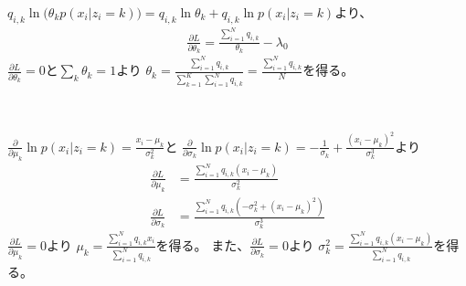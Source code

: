 \documentclass[aspectratio=169,unicode,dvipdfmx,14pt]{beamer}
\begin{document}
\begin{frame}
\FontMath
$q_{i,k} \ln \big( \theta_k p(x_i | z_i = k) \big)
= q_{i,k} \ln \theta_k + q_{i,k} \ln p(x_i | z_i = k)$より、
\begin{align}
\frac{\partial L}{\partial \theta_k}
= \frac{ \sum_{i=1}^N  q_{i,k} }{ \theta_k } - \lambda_0
\end{align}
$\frac{\partial L}{\partial \theta_k} = 0$と$\sum_k \theta_k = 1$より
$\theta_k = \frac{ \sum_{i=1}^N q_{i,k} }{ \sum_{k=1}^K \sum_{i=1}^N q_{i,k} } = \frac{ \sum_{i=1}^N q_{i,k} }{ N }$を得る。

\

$\frac{\partial }{\partial \mu_k} \ln p(x_i | z_i = k) = \frac{ x_i - \mu_k }{\sigma_k^2}$と
$\frac{\partial }{\partial \sigma_k} \ln p(x_i | z_i = k) = - \frac{1}{\sigma_k} + \frac{ (x_i - \mu_k)^2 }{\sigma_k^3}$より
\begin{align}
\frac{\partial L}{\partial \mu_k}
& = \frac{ \sum_{i=1}^N q_{i,k} (x_i - \mu_k) }{\sigma_k^2} \\
\frac{\partial L}{\partial \sigma_k}
& = \frac{ \sum_{i=1}^N q_{i,k} ( - \sigma_k^2 + (x_i - \mu_k)^2 ) }{\sigma_k^3}
\end{align}
$\frac{\partial L}{\partial \mu_k} = 0$より
$\mu_k = \frac{ \sum_{i=1}^N q_{i,k} x_i }{ \sum_{i=1}^N q_{i,k} }$を得る。
また、$\frac{\partial L}{\partial \sigma_k} = 0$より
$\sigma_k^2 = \frac{ \sum_{i=1}^N q_{i,k} (x_i - \mu_k) }{ \sum_{i=1}^N q_{i,k} }$を得る。
\end{frame}
\end{document}
